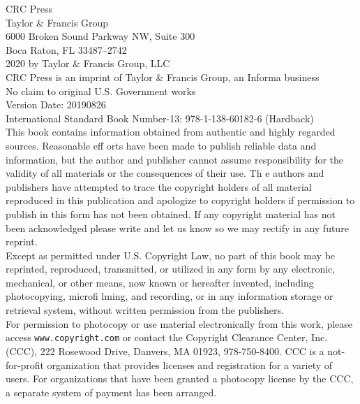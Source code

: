 \documentclass[twoside,11pt]{book}
\begin{document}
{\small
\noindent
CRC Press\\[0.3em]
Taylor \& Francis Group\\
6000 Broken Sound Parkway NW, Suite 300\\[0.3em]
Boca Raton, FL 33487–2742\\[0.5em]

{\setlength{\parindent}{0pt}
\noindent
\textcopyright{} 2020 by Taylor \& Francis Group, LLC\\
CRC Press is an imprint of Taylor \& Francis Group, an Informa business\\[0.5em]

No claim to original U.S. Government works\\[0.5em]

Version Date: 20190826\\[0.5em]

International Standard Book Number-13: 978-1-138-60182-6 (Hardback)\\

This book contains information obtained from authentic and highly regarded sources. Reasonable eff orts have been
made to publish reliable data and information, but the author and publisher cannot assume responsibility for the
validity of all materials or the consequences of their use. Th e authors and publishers have attempted to trace the
copyright holders of all material reproduced in this publication and apologize to copyright holders if permission to
publish in this form has not been obtained. If any copyright material has not been acknowledged please write and let
us know so we may rectify in any future reprint.\\[0.25em]

Except as permitted under U.S. Copyright Law, no part of this book may be reprinted, reproduced, transmitted,
or utilized in any form by any electronic, mechanical, or other means, now known or hereafter invented, including photocopying, microfi lming, and recording, or in any information storage or retrieval system, without written
permission from the publishers.\\[0.25em]

For permission to photocopy or use material electronically from this work, please access \texttt{www.copyright.com}
or contact the Copyright Clearance Center, Inc. (CCC), 222 Rosewood Drive, Danvers, MA 01923, 978-750-8400.
CCC is a not-for-profit organization that provides licenses and registration for a variety of users.
For organizations that have been granted a photocopy license by the CCC, a separate system of payment has been arranged.\\[0.25em]

}}
\end{document}
